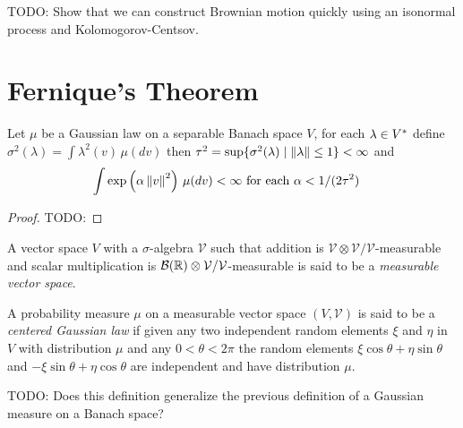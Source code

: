 TODO: Show that we can construct Brownian motion quickly using an
isonormal process and Kolomogorov-Centsov.

\section{Fernique's Theorem}

\begin{thm}Let $\mu$ be a Gaussian law on a separable Banach space $V$, for each $\lambda \in {V}^*$ define $\sigma^2(\lambda) = \int \lambda^2(v) \, \mu(dv)$ then $\tau^2 = \sup \lbrace \sigma^2(\lambda) \mid \left \lVert \lambda \right \rVert \leq 1 \rbrace < \infty$ and 
\begin{align*}
\int \exp\left( \alpha \left \lVert v \right \rVert^2 \right) \, \mu(dv) &< \infty \text{ for each $\alpha < 1/(2\tau^2)$}
\end{align*}
\end{thm}
\begin{proof}
TODO:
\end{proof}

\begin{defn}A vector space $V$ with a $\sigma$-algebra $\mathcal{V}$ such that addition is $\mathcal{V} \otimes \mathcal{V}/\mathcal{V}$-measurable and scalar multiplication is 
$\mathcal{B}(\mathbb{R}) \otimes \mathcal{V} / \mathcal{V}$-measurable is said to be a \emph{measurable vector space}.
\end{defn}

\begin{defn}A probability measure $\mu$ on a measurable vector space $(V, \mathcal{V})$ is said to be a \emph{centered Gaussian law} if given any two independent random elements $\xi$ and $\eta$ in $V$ with distribution $\mu$ and any $0 < \theta < 2\pi$ the random elements $\xi \cos \theta + \eta \sin \theta$ and $- \xi \sin \theta + \eta \cos \theta$ are independent and have distribution $\mu$.
\end{defn}

TODO: Does this definition generalize the previous definition of a Gaussian measure on a Banach space?

